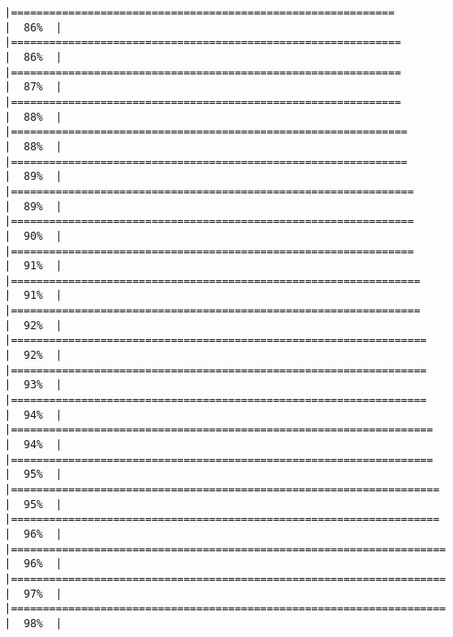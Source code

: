 \documentclass[
]{article}
\begin{document}
\begin{verbatim}
|============================================================          |  86%  |                                                                              |=============================================================         |  86%  |                                                                              |=============================================================         |  87%  |                                                                              |=============================================================         |  88%  |                                                                              |==============================================================        |  88%  |                                                                              |==============================================================        |  89%  |                                                                              |===============================================================       |  89%  |                                                                              |===============================================================       |  90%  |                                                                              |===============================================================       |  91%  |                                                                              |================================================================      |  91%  |                                                                              |================================================================      |  92%  |                                                                              |=================================================================     |  92%  |                                                                              |=================================================================     |  93%  |                                                                              |=================================================================     |  94%  |                                                                              |==================================================================    |  94%  |                                                                              |==================================================================    |  95%  |                                                                              |===================================================================   |  95%  |                                                                              |===================================================================   |  96%  |                                                                              |====================================================================  |  96%  |                                                                              |====================================================================  |  97%  |                                                                              |====================================================================  |  98%  |                                                                              
\end{verbatim}
\end{document}
